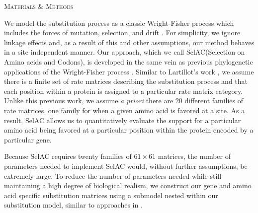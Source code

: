 \documentclass[12pt,letterpaper]{article}
\renewcommand{\section}[1]{%
\bigskip
\begin{center}
\begin{Large}
\normalfont\scshape #1
\medskip
\end{Large}
\end{center}}
\renewcommand{\subsection}[1]{%
\bigskip
\begin{center}
\begin{large}
\normalfont\itshape #1
\end{large}
\end{center}}
\newcommand{\selac}{SelAC\xspace}
\begin{document}
\section{Materials \& Methods}


We model the substitution process as a classic Wright-Fisher process which includes the forces of mutation, selection, and drift \citep{Fisher1930,Kimura1962,Wright1969,Iwasa1988,BergAndLassig2003,SellaAndHirsh2005,McCandlishAndStoltzfus2014}.
For simplicity, we ignore linkage effects and, as a result of this and other assumptions, our method behaves in a site independent manner.
Our approach, which we call \selac (Selection on Amino acids and Codons), is developed in the same vein as previous phylogenetic applications of the Wright-Fisher process \citep[e.g.][]{MuseAndGaut1994,HalpernAndBruno1998,YangAndNielsen2008,RodrigueEtAl2005,KoshiAndGoldstein1997,KoshiEtAl1999,DimmicEtAl2000,ThorneEtAl2012,LartillotAndPhilippe2004,RodrigueAndLartillot2014}.
Similar to Lartillot's work \citep{LartillotAndPhilippe2004,RodrigueAndLartillot2014}, we assume there is a finite set of rate matrices describing the substitution process and that each position within a protein is assigned to a particular rate matrix category.
Unlike this previous work, we assume \emph{a priori} there are 20 different families of rate matrices, one family for when a given amino acid is favored at a site.
As a result, \selac allows us to quantitatively evaluate the support for a particular amino acid being favored at a particular position within the protein encoded by a particular gene.

Because \selac requires twenty families of $61 \times 61$ matrices, the number of parameters needed to implement \selac would, without further assumptions, be extremely large.
To reduce the number of parameters needed while still maintaining a high degree of biological realism, we construct our gene and amino acid specific substitution matrices using a submodel nested within our substitution model, similar to approaches in \citet{Gilchrist2007,ShahAndGilchrist2011,GilchristEtAl2015}.
\end{document}
